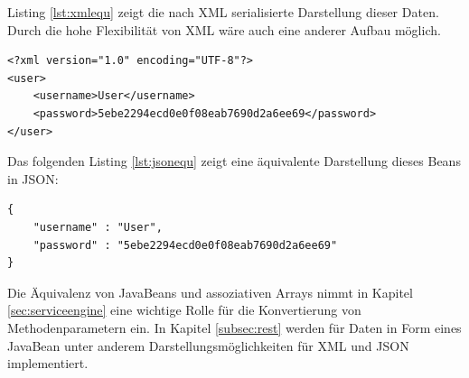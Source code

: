 Listing \ref{lst:xmlequ} zeigt die nach \ac{XML} serialisierte Darstellung dieser
Daten. Durch die hohe Flexibilität von \ac{XML} wäre auch eine anderer Aufbau
möglich.

\lstset{language=xml}
\begin{lstlisting}[caption=XML Darstellung eines JavaBean, label=lst:xmlequ]
<?xml version="1.0" encoding="UTF-8"?>
<user>
	<username>User</username>
	<password>5ebe2294ecd0e0f08eab7690d2a6ee69</password>
</user>
\end{lstlisting}
\pagebreak
Das folgenden Listing \ref{lst:jsonequ} zeigt eine äquivalente Darstellung
dieses Beans in \ac{JSON}:

\lstset{language=Java}
\begin{lstlisting}[caption=JSON Darstellung eines JavaBean, label=lst:jsonequ]
{ 
	"username" : "User",
	"password" : "5ebe2294ecd0e0f08eab7690d2a6ee69"
}
\end{lstlisting}

Die Äquivalenz von JavaBeans und assoziativen Arrays nimmt in Kapitel
\ref{sec:serviceengine} eine wichtige Rolle für die Konvertierung von
Methodenparametern ein. In Kapitel \ref{subsec:rest} werden für Daten
in Form eines JavaBean unter anderem Darstellungsmöglichkeiten für \ac{XML} und
\ac{JSON} implementiert.